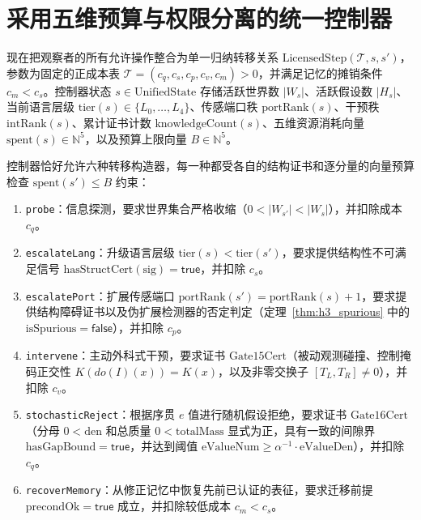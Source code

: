 \documentclass[11pt,a4paper]{article}
\theoremstyle{cleanthm}
\theoremstyle{cleandef}
\begin{document}
\section{采用五维预算与权限分离的统一控制器}

现在把观察者的所有允许操作整合为单一归纳转移关系 $\mathrm{LicensedStep}(\mathcal{T}, s, s')$，参数为固定的正成本表 $\mathcal{T} = (c_q, c_s, c_p, c_v, c_m) > 0$，并满足记忆的摊销条件 $c_m < c_s$。控制器状态 $s\in\mathrm{UnifiedState}$ 存储活跃世界数 $|W_s|$、活跃假设数 $|H_s|$、当前语言层级 $\mathrm{tier}(s)\in\{L_0,\dots,L_4\}$、传感端口秩 $\mathrm{portRank}(s)$、干预秩 $\mathrm{intRank}(s)$、累计证书计数 $\mathrm{knowledgeCount}(s)$、五维资源消耗向量 $\mathrm{spent}(s)\in\mathbb{N}^5$，以及预算上限向量 $B\in\mathbb{N}^5$。

控制器恰好允许六种转移构造器，每一种都受各自的结构证书和逐分量的向量预算检查 $\mathrm{spent}(s') \le B$ 约束：
\begin{enumerate}
  \item \texttt{probe}：信息探测，要求世界集合严格收缩（$0 < |W_{s'}| < |W_s|$），并扣除成本 $c_q$。
  \item \texttt{escalateLang}：升级语言层级 $\mathrm{tier}(s) < \mathrm{tier}(s')$，要求提供结构性不可满足信号 $\mathrm{hasStructCert}(\mathrm{sig})=\mathsf{true}$，并扣除 $c_s$。
  \item \texttt{escalatePort}：扩展传感端口 $\mathrm{portRank}(s')=\mathrm{portRank}(s)+1$，要求提供结构障碍证书以及伪扩展检测器的否定判定（定理~\ref{thm:h3_spurious} 中的 $\mathrm{isSpurious}=\mathsf{false}$），并扣除 $c_p$。
  \item \texttt{intervene}：主动外科式干预，要求证书 $\mathrm{Gate15Cert}$（被动观测碰撞、控制掩码正交性 $K(do(I)(x))=K(x)$，以及非零交换子 $[T_L,T_R]\ne 0$），并扣除 $c_v$。
  \item \texttt{stochasticReject}：根据序贯 $e$ 值进行随机假设拒绝，要求证书 $\mathrm{Gate16Cert}$（分母 $0<\mathrm{den}$ 和总质量 $0<\mathrm{totalMass}$ 显式为正，具有一致的间隙界 $\mathrm{hasGapBound}=\mathsf{true}$，并达到阈值 $\mathrm{eValueNum}\ge \alpha^{-1}\cdot\mathrm{eValueDen}$），并扣除 $c_q$。
  \item \texttt{recoverMemory}：从修正记忆中恢复先前已认证的表征，要求迁移前提 $\mathrm{precondOk}=\mathsf{true}$ 成立，并扣除较低成本 $c_m < c_s$。
\end{enumerate}
\end{document}
